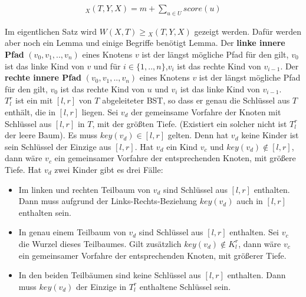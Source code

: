 \documentclass[a4paper,12pt]{article}
\begin{document}
\begin{align*}
_X(T, Y, X)  = m + \sum_{u \in U} {\mathit{score}} \left(u\right)
\end{align*} 

\noindent Im eigentlichen Satz wird $\mathit{W\left(X, T\right)} \geq {_X(T, Y, X)} $ gezeigt werden. Dafür werden aber noch ein Lemma und einige Begriffe benötigt Lemma. Der \textbf{linke innere Pfad} $\left(v_0,v_1,..,v_n \right)$ eines Knotens $v$ ist der längst mögliche Pfad für den gilt, $v_0$ ist das linke Kind von $v$ und für $i \in \{1,..,n\}$,$v_i$ ist das rechte Kind von $v_{i-1}$. Der \textbf{rechte innere Pfad} $\left(v_0,v_1,..,v_n \right)$ eines Knotens $v$ ist der längst mögliche Pfad für den gilt, $v_0$ ist das rechte Kind von $u$ und $v_i$ ist das linke Kind von $v_{i-1}$.\\ $T^r_l$ ist ein mit $\left[l,r\right]$ von $T$ abgeleiteter BST, so dass er genau die Schlüssel aus $T$ enthält, die in $\left[l, r\right]$ liegen. Sei $v_d$ der gemeinsame Vorfahre der Knoten mit Schlüssel aus  $\left[l,r\right]$ in $T$, mit der größten Tiefe. (Existiert ein solcher nicht ist $T^r_l$ der leere Baum). Es muss $\mathit{key}(v_d) \in \left[l,r\right]$ gelten. Denn hat $v_d$ keine Kinder ist sein Schlüssel der Einzige aus $\left[l,r\right]$. Hat $v_d$ ein Kind $v_{c}$ und $\mathit{key}(v_d) \notin \left[l,r\right]$, dann wäre $v_{c}$ ein gemeinsamer Vorfahre der entsprechenden Knoten, mit größere Tiefe. Hat $v_d$ zwei Kinder gibt es drei Fälle:
\begin{itemize}
	\item Im linken und rechten Teilbaum von $v_d$ sind Schlüssel aus $\left[l,r\right]$ enthalten. Dann muss aufgrund der Links-Rechts-Beziehung  $\mathit{key}(v_d)$ auch in $\left[l,r\right]$ enthalten sein.
	\item In genau einem Teilbaum von $v_d$ sind Schlüssel aus $\left[l,r\right]$ enthalten. Sei $v_{c}$ die Wurzel dieses Teilbaumes. Gilt zusätzlich $\mathit{key}(v_d) \notin K^r_l$, dann wäre $v_c$ ein  gemeinsamer Vorfahre der entsprechenden Knoten, mit größerer Tiefe.
	\item In den beiden Teilbäumen sind keine Schlüssel aus $\left[l,r\right]$ enthalten.  Dann muss $\mathit{key}(v_d)$ der Einzige in $T^r_l$ enthaltene Schlüssel sein.
\end{itemize}
\end{document}
